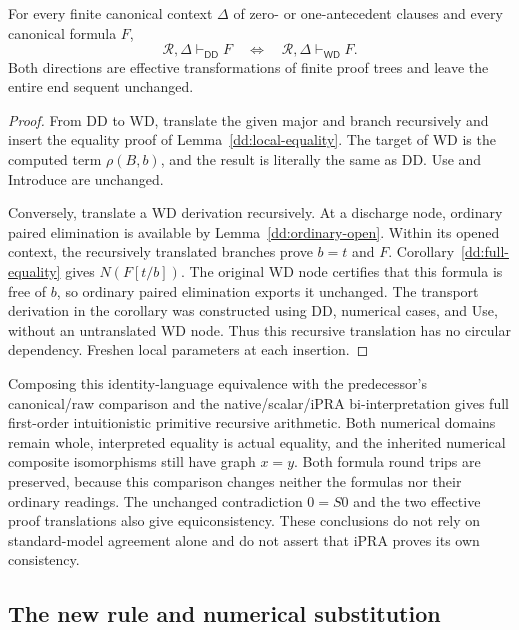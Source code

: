 \begin{theorem}
\label{dd:equivalence}
For every finite canonical context $\Delta$ of zero- or one-antecedent
clauses and every canonical formula $F$,
\[
 \mathcal R,\Delta\vdash_{\mathsf{DD}}F
 \quad\Longleftrightarrow\quad
 \mathcal R,\Delta\vdash_{\mathsf{WD}}F.
\]
Both directions are effective transformations of finite proof trees and
leave the entire end sequent unchanged.
\end{theorem}
\begin{proof}
From DD to WD, translate the given major and branch recursively and insert
the equality proof of Lemma~\ref{dd:local-equality}.  The target of WD is
the computed term $\rho(B,b)$, and the result is literally the same as DD.
Use and Introduce are unchanged.

Conversely, translate a WD derivation recursively.  At a discharge node,
ordinary paired elimination is available by Lemma~\ref{dd:ordinary-open}.
Within its opened context, the recursively translated branches prove
$b=t$ and $F$.  Corollary~\ref{dd:full-equality} gives
$N(F[t/b])$.  The original WD node certifies that this formula is free of
$b$, so ordinary paired elimination exports it unchanged.  The transport
derivation in the corollary was constructed using DD, numerical cases,
and Use, without an untranslated WD node.  Thus this recursive translation
has no circular dependency.  Freshen local parameters at each insertion.
\end{proof}

Composing this identity-language equivalence with the predecessor's
canonical/raw comparison and the native/scalar/iPRA bi-interpretation gives
full first-order intuitionistic primitive recursive arithmetic.  Both
numerical domains remain whole, interpreted equality is actual equality,
and the inherited numerical composite isomorphisms still have graph $x=y$.
Both formula round trips are preserved, because this comparison changes
neither the formulas nor their ordinary readings.  The unchanged
contradiction $0=S0$ and the two effective proof translations also give
equiconsistency.  These conclusions do not rely on standard-model agreement
alone and do not assert that iPRA proves its own consistency.

\subsection{The new rule and numerical substitution}

